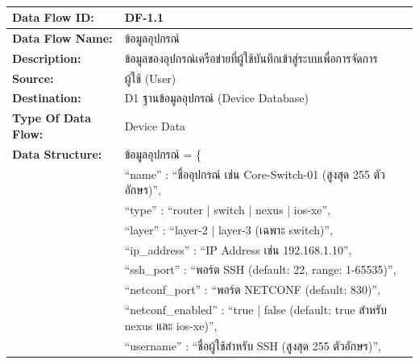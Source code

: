 
\begin{table}[H]
    \caption{}
    \label{tab:df-1-1}
    \fontSixTeen 
    \begin{tabularx}{\textwidth}{|l|L|} 
        \hline
        \textbf{Data Flow ID:} & DF-1.1 \\
        \hline
        \textbf{Data Flow Name:} & ข้อมูลอุปกรณ์ \\
        \hline
        \textbf{Description:} & ข้อมูลของอุปกรณ์เครือข่ายที่ผู้ใช้บันทึกเข้าสู่ระบบเพื่อการจัดการ \\
        \hline
        \textbf{Source:} & ผู้ใช้ (User) \\
        \hline
        \textbf{Destination:} & D1 ฐานข้อมูลอุปกรณ์ (Device Database) \\
        \hline
        \textbf{Type Of Data Flow:} & Device Data \\
        \hline
        \textbf{Data Structure:} & ข้อมูลอุปกรณ์ = \{ \nonumber \\
                        & \hspace{1em} ``name'' : ``ชื่ออุปกรณ์ เช่น Core-Switch-01 (สูงสุด 255 ตัวอักษร)'', \nonumber \\
                        & \hspace{1em} ``type'' : ``router | switch | nexus | ios-xe'', \nonumber \\
                        & \hspace{1em} ``layer'' : ``layer-2 | layer-3 (เฉพาะ switch)'', \nonumber \\
                        & \hspace{1em} ``ip\_address'' : ``IP Address เช่น 192.168.1.10'', \nonumber \\
                        & \hspace{1em} ``ssh\_port'' : ``พอร์ต SSH (default: 22, range: 1-65535)'', \nonumber \\
                        & \hspace{1em} ``netconf\_port'' : ``พอร์ต NETCONF (default: 830)'', \nonumber \\
                        & \hspace{1em} ``netconf\_enabled'' : ``true | false (default: true สำหรับ nexus และ ios-xe)'', \nonumber \\
                        & \hspace{1em} ``username'' : ``ชื่อผู้ใช้สำหรับ SSH (สูงสุด 255 ตัวอักษร)'', \nonumber \\

\end{tabularx}
\end{table}
